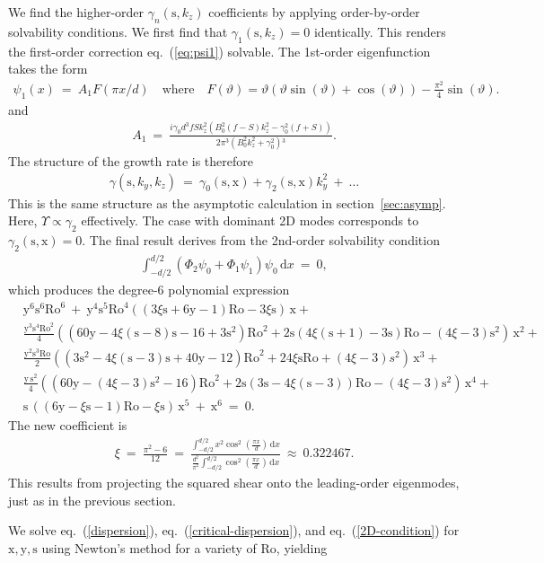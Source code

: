 \documentclass[openacc]{rsproca_new}%
\newcommand\Beq{\begin{eqnarray}}
\newcommand\Eeq{\end{eqnarray}}
\newcommand{\eq}[1]{eq.~(\ref{#1})}
\newcommand{\Ro}{\mathrm{Ro}}
\newcommand{\s}{\text{s}}
\newcommand{\x}{\text{x}}
\newcommand{\y}{\text{y}}
\newcommand{\dd}[1]{\,\mathrm{d}{#1}}
\begin{document}
We find the higher-order $\gamma_{n}(\s,k_{z})$ coefficients by applying order-by-order solvability conditions. We first find that $\gamma_{1}(\s, k_{z}) = 0$ identically. This renders the first-order correction \eq{eq:psi1} solvable. The 1st-order eigenfunction takes the form 
\Beq
\psi_{1}(x) \ = \ A_{1} F(\pi x/d) \quad \text{where} \quad  F(\vartheta) = \vartheta (\vartheta \sin (\vartheta)+\cos (\vartheta))-\frac{\pi^{2}}{4} \sin (\vartheta).
\Eeq
and
\Beq
A_{1} \ = \ \frac{i \gamma _0 d^3 f S k_z^2 \left(B_0^2 (f-S) k_z^2-\gamma _0^2
   (f+S)\right)}{2 \pi ^3 \left(B_0^2 k_z^2+\gamma _0^2\right){}^{\!3}}.
\Eeq
The structure of the growth rate is therefore 
\Beq
\gamma(\s,k_{y},k_{z}) \ = \ \gamma_{0}(\s,\x) + \gamma_{2}(\s,\x) k_{y}^{2} \ + \ \ldots 
\Eeq
This is the same structure as the asymptotic calculation in section~\ref{sec:asymp}. Here, $\Upsilon \propto \gamma_{2}$ effectively. The case with dominant 2D modes corresponds to $\gamma_{2}(\s,\x)=0$.  The final result derives from the 2nd-order solvability condition 
\Beq
\int_{-d/2}^{d/2} ( \Phi_{2} \psi_{0} + \Phi_{1} \psi_{1} ) \psi_{0} \dd{x}  \ = \ 0,
\Eeq
which produces the degree-6 polynomial expression  
\Beq
& \y^{6} \s^6\Ro^6  \ + \
 \y^4 \s^5 \Ro^4   \left( (3 \xi  \s+6 \y-1)\Ro -3 \xi  \s \right) \, \x +
  \nonumber \\  
& \frac{ \y^3 \s^4 \Ro^2  }{4}  \left( (60 \y -4 \xi  (\s-8) \s -16 + 3 \s^2)\Ro^{2} + 2 \s (4 \xi  (\s+1)-3 \s) \Ro - (4 \xi -3 ) \s^2 \right) \, \x^{2} + \nonumber \\ 
& \frac{\y^2  \s^3 \Ro }{2}  \left( (3 \s^2-4 \xi  (\s-3) \s+40 \y-12) \Ro^{2} + 24 \xi \s \Ro + (4 \xi -3) s^2 \right) \, \x^{3} + 
\nonumber \\ 
&  \frac{\y \,\s^2}{4} \left( (60 \y -(4 \xi -3) \s^2 - 16)\Ro^{2} + 2\s(3 \s-4 \xi  (\s-3)) \Ro - (4 \xi -3) \s^2 \right)\, \x^{4} +\nonumber \\ 
 &  \s\, (( 6 \y -\xi  \s-1) \Ro- \xi  \s) \, \x^{5}  \ + \   
   \x^{6} \ = \ 0.
   \label{2D-condition}
\Eeq
The new coefficient is
\Beq
\xi \ = \ \frac{\pi^{2}-6}{12} \ = \ \frac{\int_{-d/2}^{d/2} x^2 \cos ^2\left(\frac{\pi  x}{d}\right) \dd{x}}{\frac{d^{2}}{\pi^{2}}\int_{-d/2}^{d/2}  \cos ^2\left(\frac{\pi  x}{d}\right) \dd{x}} \ \approx \ 0.322467.
\Eeq
This results from projecting the squared shear onto the leading-order eigenmodes, just as in the previous section. 

We solve \eq{dispersion}, \eq{critical-dispersion}, and  \eq{2D-condition} for $\x,\y,\s$ using Newton's method for a variety of $\Ro$, yielding
\end{document}
